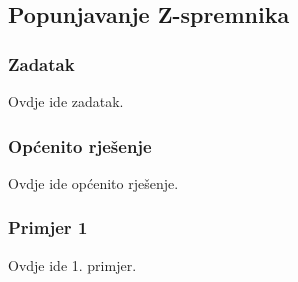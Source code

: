 \subsection{Popunjavanje Z-spremnika}
\subsubsection{Zadatak}
Ovdje ide zadatak.
\subsubsection{Općenito rješenje}
Ovdje ide općenito rješenje.
\subsubsection{Primjer 1}
Ovdje ide 1. primjer.